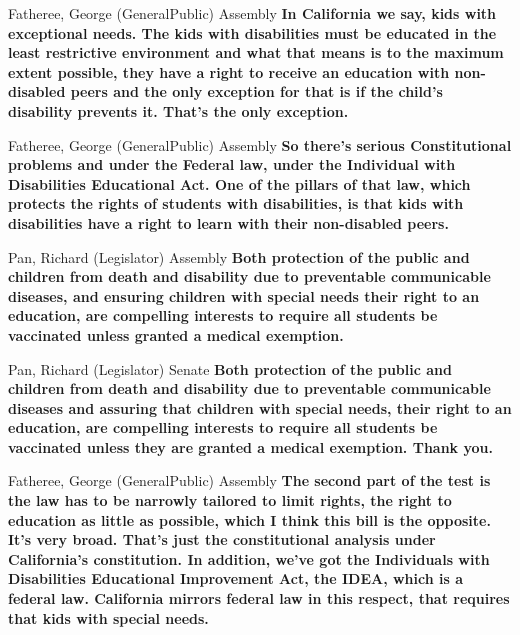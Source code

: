 \begin{result}{24.12091894665227}{Fatheree, George (GeneralPublic) Assembly}
\textbf{In California we say, kids with exceptional needs. The kids with disabilities must be educated in the least restrictive environment and what that means is to the maximum extent possible, they have a right to receive an education with non-disabled peers and the only exception for that is if the child's disability prevents it. That's the only exception.
}\end{result}

\begin{result}{15.144270314277417}{Fatheree, George (GeneralPublic) Assembly}
\textbf{So there's serious Constitutional problems and under the Federal law, under the Individual with Disabilities Educational Act. One of the pillars of that law, which protects the rights of students with disabilities, is that kids with disabilities have a right to learn with their non-disabled peers.
}\end{result}

\begin{result}{14.434302341382798}{Pan, Richard (Legislator) Assembly}
\textbf{Both protection of the public and children from death and disability due to preventable communicable diseases, and ensuring children with special needs their right to an education, are compelling interests to require all students be vaccinated unless granted a medical exemption.
}\end{result}

\begin{result}{13.880531196968432}{Pan, Richard (Legislator) Senate}
\textbf{Both protection of the public and children from death and disability due to preventable communicable diseases and assuring that children with special needs, their right to an education, are compelling interests to require all students be vaccinated unless they are granted a medical exemption. Thank you.
}\end{result}

\begin{result}{13.081970355015326}{Fatheree, George (GeneralPublic) Assembly}
\textbf{The second part of the test is the law has to be narrowly tailored to limit rights, the right to education as little as possible, which I think this bill is the opposite. It's very broad. That's just the constitutional analysis under California's constitution. In addition, we've got the Individuals with Disabilities Educational Improvement Act, the IDEA, which is a federal law. California mirrors federal law in this respect, that requires that kids with special needs.
}\end{result}

